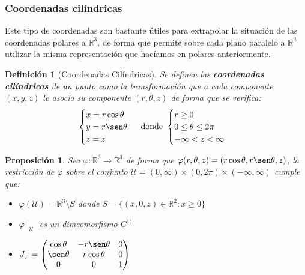 \documentclass[10pt,a4paper,openright]{book}
\theoremstyle{break}
\newtheorem*{defi}{Definición}
\newtheorem*{prop}{Proposición}
\begin{document}
\subsubsection{Coordenadas cilíndricas}
Este tipo de coordenadas son bastante útiles para extrapolar la situación de las coordenadas polares a $\mathbb{R}^3$, de forma que permite sobre cada plano paralelo a $\mathbb{R}^2$ utilizar la misma representación que hacíamos en polares anteriormente.

\begin{defi}[Coordenadas Cilíndricas]
Se definen las \textbf{coordenadas cilíndricas} de un punto como la transformación que a cada componente $(x,y,z)$ le asocia su componente $(r, \theta, z)$ de forma que se verifica:
$$\begin{cases} x = r \cos \theta \\ y = r \sen \theta \\ z = z\end{cases} \mbox{ donde } \begin{cases} r \ge 0\\ 0 \le \theta \le 2\pi \\ -\infty < z < \infty \end{cases}$$
\end{defi}

\begin{prop}
Sea $\varphi: \mathbb{R}^3\rightarrow  \mathbb{R}^3$ de forma que $\varphi(r, \theta, z) = (r\cos\theta, r\sen\theta, z)$, la restricción de $\varphi$ sobre el conjunto $\mathcal{U} = (0,\infty)\times (0, 2\pi) \times (-\infty, \infty)$ cumple que:
\begin{itemize}
\item $\varphi(\mathcal{U}) = \mathbb{R}^3\setminus{S}$ donde $S = \{(x,0,z)\in \mathbb{R}^2: x\geq 0\}$
\item $\varphi\mid_\mathcal{U}$ es un dimeomorfismo-$C^{1)}$
\item $J_\varphi = \begin{pmatrix}\cos \theta & -r\sen \theta & 0 \\ \sen \theta & r\cos \theta & 0 \\ 0 & 0 & 1\end{pmatrix}$
\end{itemize}
\end{prop}
\end{document}
